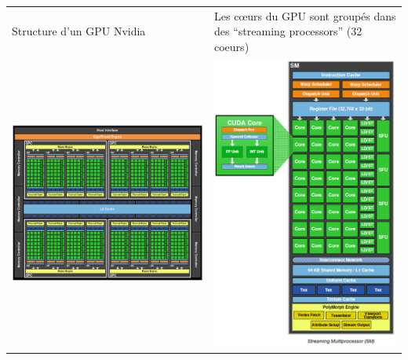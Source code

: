 \documentclass[usenames,dvipsnames]{beamer}
\begin{document}
\begin{frame}
\begin{tabular}{ll}
	Structure d'un GPU Nvidia &
	\begin{minipage}{0.5\textwidth}
		Les c\oe urs du GPU sont groupés dans des ``streaming processors'' (32 coeurs)
	\end{minipage} \\	
	\includegraphics[scale=1]{../../Images/Nvidia}&
	\includegraphics[scale=0.8]{../../Images/Nvidia2}

\end{tabular}
\end{frame}
\end{document}
